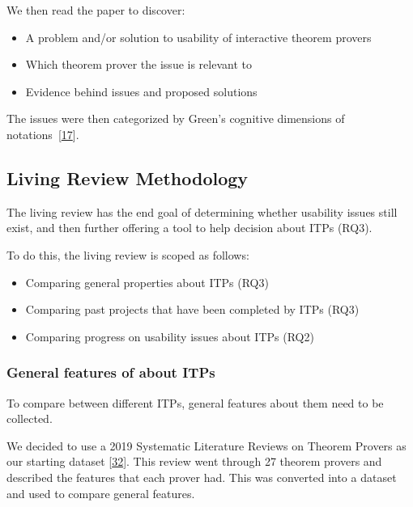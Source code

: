 \documentclass[
]{article}
\providecommand{\tightlist}{%
  \setlength{\itemsep}{0pt}\setlength{\parskip}{0pt}}
\begin{document}
We then read the paper to discover:

\begin{itemize}
\tightlist
\item
  A problem and/or solution to usability of interactive theorem provers
\item
  Which theorem prover the issue is relevant to
\item
  Evidence behind issues and proposed solutions
\end{itemize}

The issues were then categorized by Green's cognitive dimensions of
notations~{[}\protect\hyperlink{ref-green_usability_1996}{17}{]}.

\hypertarget{living-review-methodology}{%
\subsection{Living Review Methodology}\label{living-review-methodology}}

The living review has the end goal of determining whether usability
issues still exist, and then further offering a tool to help decision
about ITPs (RQ3).

To do this, the living review is scoped as follows:

\begin{itemize}
\tightlist
\item
  Comparing general properties about ITPs (RQ3)
\item
  Comparing past projects that have been completed by ITPs (RQ3)
\item
  Comparing progress on usability issues about ITPs (RQ2)
\end{itemize}

\hypertarget{general-features-of-about-itps}{%
\subsubsection{General features of about
ITPs}\label{general-features-of-about-itps}}

To compare between different ITPs, general features about them need to
be collected.

We decided to use a 2019 Systematic Literature Reviews on Theorem
Provers as our starting dataset
{[}\protect\hyperlink{ref-nawaz_survey_2019}{32}{]}. This review went
through 27 theorem provers and described the features that each prover
had. This was converted into a dataset and used to compare general
features.
\end{document}
